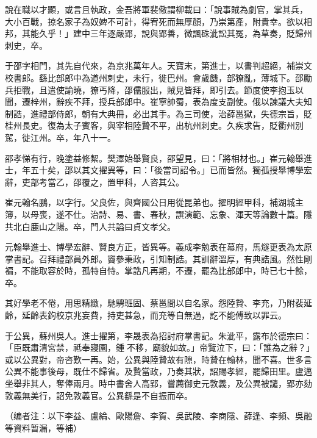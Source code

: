 \begin{pinyinscope}
 說在職以才顯，或言且執政，金吾將軍裴儆謂柳載曰：「說事賊為劇官，掌其兵，大小百戰，掠名家子為奴婢不可計，得宥死而無厚顏，乃崇第產，附貴幸。欲以相邦，其能久乎！」建中三年逐嚴郢，說與郢善，微諷硃泚訟其冤，為草奏，貶歸州刺史，卒。



 于邵字相門，其先自代來，為京兆萬年人。天寶末，第進士，以書判超絕，補崇文校書郎。繇比部郎中為道州刺史，未行，徙巴州。會歲饑，部獠亂，薄城下。邵勵兵拒戰，且遣使諭曉，獠丐降，邵儒服出，賊見皆拜，即引去。節度使李抱玉以聞，遷梓州，辭疾不拜，授兵部郎中。崔寧帥蜀，表為度支副使。俄以諫議大夫知制誥，進禮部侍郎，朝有大典冊，必出其手。為三司使，治薛邕獄，失德宗旨，貶桂州長史。復為太子賓客，與宰相陸贄不平，出杭州刺史。久疾求告，貶衢州別駕，徙江州。卒，年八十一。



 邵孝悌有行，晚塗益修絜。樊澤始舉賢良，邵望見，曰：「將相材也。」崔元翰舉進士，年五十矣，邵以其文擢異等，曰：「後當司詔令。」已而皆然。獨孤授舉博學宏辭，吏部考當乙，邵覆之，置甲科，人咨其公。



 崔元翰名鵬，以字行。父良佐，與齊國公日用從昆弟也。擢明經甲科，補湖城主簿，以母喪，遂不仕。治詩、易、書、春秋，譔演範、忘象、渾天等論數十篇。隱共北白鹿山之陽。卒，門人共謚曰貞文孝父。



 元翰舉進士、博學宏辭、賢良方正，皆異等。義成李勉表在幕府，馬燧更表為太原掌書記。召拜禮部員外郎。竇參秉政，引知制誥。其訓辭溫厚，有典誥風。然性剛褊，不能取容於時，孤特自恃。掌誥凡再期，不遷，罷為比部郎中，時已七十餘，卒。



 其好學老不倦，用思精緻，馳騁班固、蔡邕間以自名家。怨陸贄、李充，乃附裴延齡，延齡表鉤校京兆妄費，持吏甚急，而充等自無過，訖不能傅致以罪云。



 于公異，蘇州吳人。進士擢第，李晟表為招討府掌書記。朱泚平，露布於德宗曰：「臣既肅清宮禁，祗奉寢園，鍾不移，廟貌如故。」帝覽泣下，曰：「誰為之辭？」或以公異對，帝咨歎一再。始，公異與陸贄故有隙，時贄在翰林，聞不喜。世多言公異不能事後母，既仕不歸省。及贄當政，乃奏其狀，詔賜孝經，罷歸田里。盧邁坐舉非其人，奪俸兩月。時中書舍人高郢，嘗薦御史元敦義，及公異被譴，郢亦劾敦義無美行，詔免敦義官。公異繇是不自振而卒。



 （编者注：以下李益、盧綸、歐陽詹、李賀、吳武陵、李商隱、薛逢、李頻、吳融等資料暂漏，等補）



\end{pinyinscope}